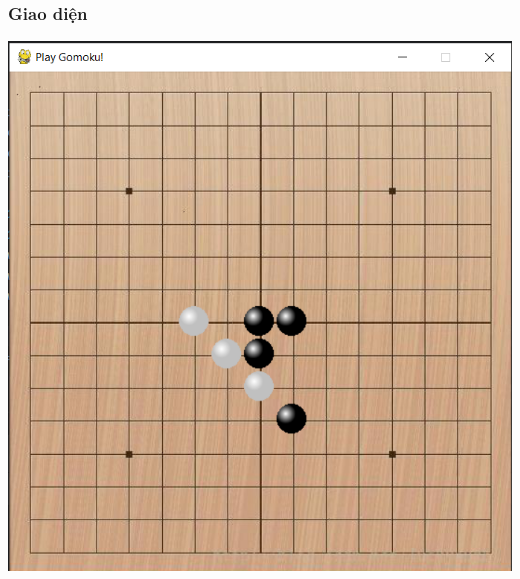 \documentclass[a4paper]{article}
\begin{document}
    \subsubsection{Giao diện}
    \includegraphics{images/PlayWithBot.png}
\end{document}
